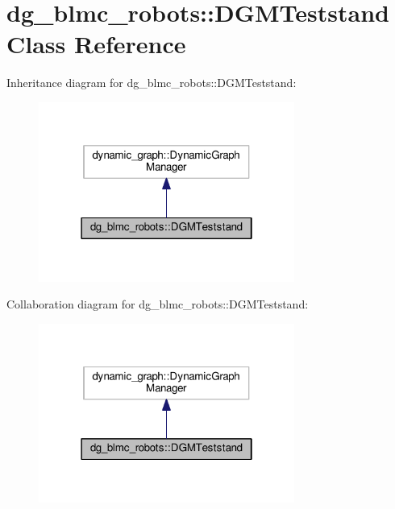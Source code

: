 \hypertarget{classdg__blmc__robots_1_1DGMTeststand}{}\section{dg\+\_\+blmc\+\_\+robots\+:\+:D\+G\+M\+Teststand Class Reference}
\label{classdg__blmc__robots_1_1DGMTeststand}


Inheritance diagram for dg\+\_\+blmc\+\_\+robots\+:\+:D\+G\+M\+Teststand\+:
\nopagebreak
\begin{figure}[H]
\begin{center}
\leavevmode
\includegraphics[width=238pt]{classdg__blmc__robots_1_1DGMTeststand__inherit__graph}
\end{center}
\end{figure}


Collaboration diagram for dg\+\_\+blmc\+\_\+robots\+:\+:D\+G\+M\+Teststand\+:
\nopagebreak
\begin{figure}[H]
\begin{center}
\leavevmode
\includegraphics[width=238pt]{classdg__blmc__robots_1_1DGMTeststand__coll__graph}
\end{center}
\end{figure}
